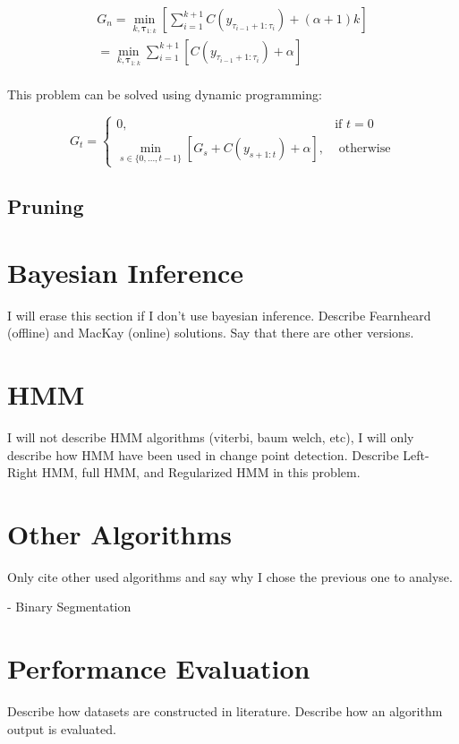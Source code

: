 \begin{equation}
    \begin{aligned}
        G_{n} = \min_{k, \boldsymbol \tau_{1 : k}} \left[ \sum \limits_{i = 1}^{k + 1} C(y_{\tau_{i - 1} + 1 : \tau_{i}}) + (\alpha + 1) k \right] \\
        = \min_{k, \boldsymbol \tau_{1 : k}} \sum \limits_{i = 1}^{k + 1} \left[ C(y_{\tau_{i - 1} + 1 : \tau_{i}}) + \alpha \right] \\
    \end{aligned}
\end{equation}

This problem can be solved using dynamic programming:

\begin{equation}
    G_{t} = 
    \begin{cases}
        0, & \text{if } t = 0 \\
        \displaystyle \min_{s \in \{0, ..., t - 1\}} \left[ G_{s} + C(y_{s + 1 : t}) + \alpha \right], & \text{ otherwise}
    \end{cases}
\end{equation}

\subsection{Pruning}

\section{Bayesian Inference}
I will erase this section if I don't use bayesian inference. Describe Fearnheard (offline) and MacKay (online) solutions. Say that there are other versions.

\section{HMM}
I will not describe HMM algorithms (viterbi, baum welch, etc), I will only describe how HMM have been used in change point detection. Describe Left-Right HMM, full HMM, and Regularized HMM in this problem.

\section{Other Algorithms}
Only cite other used algorithms and say why I chose the previous one to analyse.

- Binary Segmentation

\section{Performance Evaluation}
  Describe how datasets are constructed in literature. Describe how an algorithm output is evaluated.

